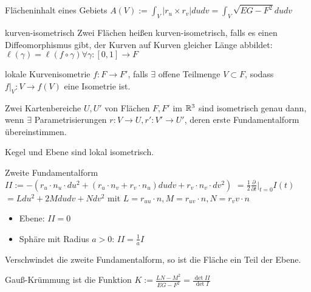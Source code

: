 \begin{bem}{Flächeninhalt eines Gebiets}
    $A(V):=\int_V|r_u\times r_v|dudv = \int_V\sqrt{EG-F^2}dudv$
\end{bem}

\begin{defi}{kurven-isometrisch}
    Zwei Flächen heißen kurven-isometrisch, falls es einen Diffeomorphismus gibt,
    der Kurven auf Kurven gleicher Länge abbildet: 
    $\ell(\gamma)=\ell(f\circ \gamma) \forall \gamma:[0,1]\to F$
\end{defi}

\begin{defi}{lokale Kurvenisometrie}
    $f:F\to F'$, falls $\exists$ offene Teilmenge $V\subset F$, sodass
    $f|_V:V\to f(V)$ eine Isometrie ist.
\end{defi}

\begin{satz}
    Zwei Kartenbereiche $U, U'$ von Flächen $F, F'$ im $\mathbb R^3$ sind isometrisch genau dann, wenn
    $\exists$ Parametrisierungen $r:V\to U, r':V'\to U'$, deren erste Fundamentalform übereinstimmen.
\end{satz}

\begin{bsp}
    Kegel und Ebene sind lokal isometrisch.
\end{bsp}

\begin{defi}{Zweite Fundamentalform}
    $II:=-(r_u \cdot n_u \cdot du^2 + (r_u \cdot n_v + r_v \cdot n_u)dudv + r_v \cdot n_v \cdot dv^2)$
        $=\frac{1}{2}\frac{\partial}{\partial t}|_{t=0}I(t)$
        $=Ldu^2+2Mdudv+Ndv^2$
        mit $L=r_{uu}\cdot n, M=r_{uv}\cdot n, N=r_vv\cdot n$
\end{defi}

\begin{bsp}
    \begin{itemize}
        \item Ebene: $II=0$
        \item Sphäre mit Radius $a>0$: $II=\frac{1}{a}I$
    \end{itemize}
\end{bsp}

\begin{satz}
    Verschwindet die zweite Fundamentalform, so ist die Fläche ein Teil der Ebene.
\end{satz}

\begin{defi}{Gauß-Krümmung}
    ist die Funktion $K:=\frac{LN-M^2}{EG-F^2}=\frac{\det II}{\det I}$
\end{defi}

